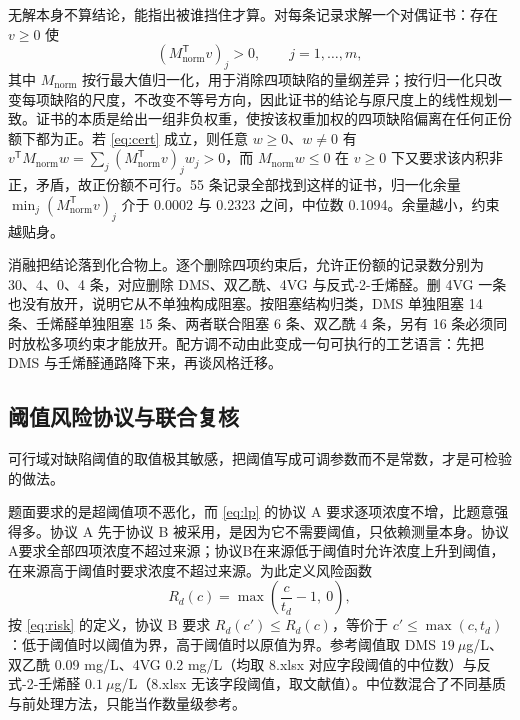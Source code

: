无解本身不算结论，能指出被谁挡住才算。对每条记录求解一个对偶证书：存在 $v\ge 0$ 使
\begin{equation}
\left(M_{\mathrm{norm}}^{\mathsf T}v\right)_{j}>0,\qquad j=1,\dots,m,
\label{eq:cert}
\end{equation}
其中 $M_{\mathrm{norm}}$ 按行最大值归一化，用于消除四项缺陷的量纲差异；按行归一化只改变每项缺陷的尺度，不改变不等号方向，因此证书的结论与原尺度上的线性规划一致。证书的本质是给出一组非负权重，使按该权重加权的四项缺陷偏离在任何正份额下都为正。若 \eqref{eq:cert} 成立，则任意 $w\ge 0$、$w\ne 0$ 有 $v^{\mathsf T}M_{\mathrm{norm}}w=\sum_{j}(M_{\mathrm{norm}}^{\mathsf T}v)_{j}w_{j}>0$，而 $M_{\mathrm{norm}}w\le 0$ 在 $v\ge 0$ 下又要求该内积非正，矛盾，故正份额不可行。55 条记录全部找到这样的证书，归一化余量 $\min_{j}(M_{\mathrm{norm}}^{\mathsf T}v)_{j}$ 介于 0.0002 与 0.2323 之间，中位数 0.1094。余量越小，约束越贴身。

消融把结论落到化合物上。逐个删除四项约束后，允许正份额的记录数分别为 30、4、0、4 条，对应删除 DMS、双乙酰、4VG 与反式-2-壬烯醛。删 4VG 一条也没有放开，说明它从不单独构成阻塞。按阻塞结构归类，DMS 单独阻塞 14 条、壬烯醛单独阻塞 15 条、两者联合阻塞 6 条、双乙酰 4 条，另有 16 条必须同时放松多项约束才能放开。配方调不动由此变成一句可执行的工艺语言：先把 DMS 与壬烯醛通路降下来，再谈风格迁移。

\subsection{阈值风险协议与联合复核}

可行域对缺陷阈值的取值极其敏感，把阈值写成可调参数而不是常数，才是可检验的做法。

题面要求的是超阈值项不恶化，而 \eqref{eq:lp} 的协议 A 要求逐项浓度不增，比题意强得多。协议 A 先于协议 B 被采用，是因为它不需要阈值，只依赖测量本身。协议A要求全部四项浓度不超过来源；协议B在来源低于阈值时允许浓度上升到阈值，在来源高于阈值时要求浓度不超过来源。为此定义风险函数
\begin{equation}
R_{d}(c)=\max\left(\frac{c}{t_{d}}-1,\ 0\right),
\label{eq:risk}
\end{equation}
按 \eqref{eq:risk} 的定义，协议 B 要求 $R_{d}(c')\le R_{d}(c)$，等价于 $c'\le\max(c,t_{d})$：低于阈值时以阈值为界，高于阈值时以原值为界。参考阈值取 DMS $19\ \mu$g/L、双乙酰 0.09 mg/L、4VG 0.2 mg/L（均取 8.xlsx 对应字段阈值的中位数）与反式-2-壬烯醛 $0.1\ \mu$g/L（8.xlsx 无该字段阈值，取文献值\cite{meilgaard1993,santos2003}）。中位数混合了不同基质与前处理方法，只能当作数量级参考。

